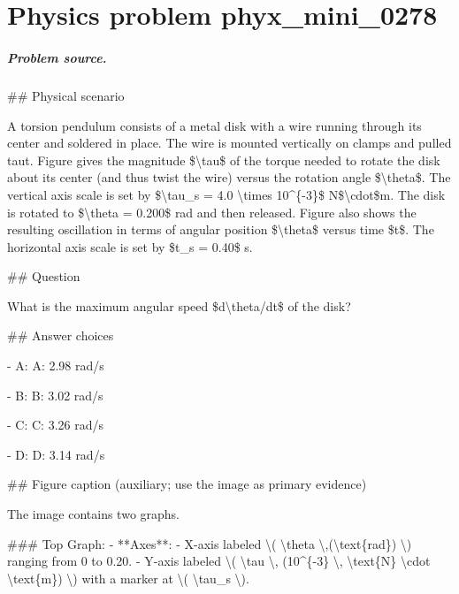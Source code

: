 
\chapter{Physics problem phyx\_mini\_0278}
\label{ch:PhyXMiniProblems_problem_phyx_mini_0278}

\paragraph{Problem source.}
\#\# Physical scenario

A torsion pendulum consists of a metal disk with a wire running through its center and soldered in place. The wire is mounted vertically on clamps and pulled taut. Figure gives the magnitude \$\textbackslash{}tau\$ of the torque needed to rotate the disk about its center (and thus twist the wire) versus the rotation angle \$\textbackslash{}theta\$. The vertical axis scale is set by \$\textbackslash{}tau\_s = 4.0 \textbackslash{}times 10\textasciicircum{}\{-3\}\$ N\$\textbackslash{}cdot\$m. The disk is rotated to \$\textbackslash{}theta = 0.200\$ rad and then released. Figure also shows the resulting oscillation in terms of angular position \$\textbackslash{}theta\$ versus time \$t\$. The horizontal axis scale is set by \$t\_s = 0.40\$ s.

\#\# Question

What is the maximum angular speed \$d\textbackslash{}theta/dt\$ of the disk?

\#\# Answer choices

- A: A: 2.98 rad/s

- B: B: 3.02 rad/s

- C: C: 3.26 rad/s

- D: D: 3.14 rad/s

\#\# Figure caption (auxiliary; use the image as primary evidence)

The image contains two graphs.

\#\#\# Top Graph:
- **Axes**: 
  - X-axis labeled \textbackslash{}( \textbackslash{}theta \textbackslash{},(\textbackslash{}text\{rad\}) \textbackslash{}) ranging from 0 to 0.20.
  - Y-axis labeled \textbackslash{}( \textbackslash{}tau \textbackslash{}, (10\textasciicircum{}\{-3\} \textbackslash{}, \textbackslash{}text\{N\} \textbackslash{}cdot \textbackslash{}text\{m\}) \textbackslash{}) with a marker at \textbackslash{}( \textbackslash{}tau\_s \textbackslash{}).
  
